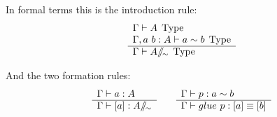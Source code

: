 In formal terms this is the introduction rule:
\begin{equation}
  \label{eq:coequalizer-intro}
  \begin{array}[t]{l}
    \Gamma \vdash A \; \operatorname{Type}\\
    \Gamma, a~b : A \vdash a \sim b \; \operatorname{Type}\\
    \hline
    \Gamma \vdash A /\!\!/\!_{\sim} \; \operatorname{Type}\\
  \end{array}
\end{equation}

And the two formation rules:
\begin{equation}
  \begin{centering}
  \label{eq:coequalizer-formation}
  \begin{array}[t]{l}
    \Gamma \vdash a : A\\
    \hline
    \Gamma \vdash [a] : A \quot{\sim}\\
  \end{array}
  \qquad
  \begin{array}[t]{l}
    \Gamma \vdash p : a \sim b\\
    \hline
    \Gamma \vdash glue~p : [a] \equiv [b]
  \end{array}
  \end{centering}
\end{equation}

